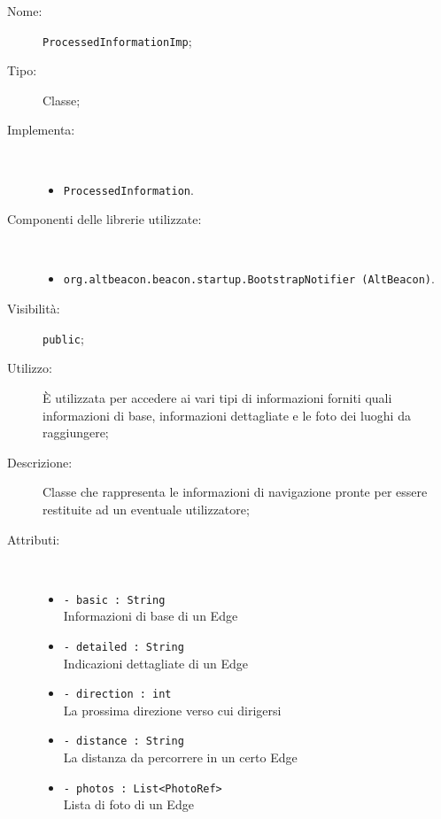 \documentclass[../DefinizioneDiProdotto.tex]{subfiles}
\begin{document}
\begin{description}
	\item[Nome:] \texttt{ProcessedInformationImp};
	\item[Tipo:] Classe;
	\item[Implementa:] \
	\begin{itemize}
		\item \texttt{ProcessedInformation}.
		
	\end{itemize}
	\item[Componenti delle librerie utilizzate:] \
	\begin{itemize}
		\item \texttt{org.altbeacon.beacon.startup.BootstrapNotifier (AltBeacon)}.
		
	\end{itemize}
	\item[Visibilità:] \texttt{public};
	\item[Utilizzo:] È utilizzata per accedere ai vari tipi di informazioni forniti quali informazioni di base, informazioni dettagliate e le foto dei luoghi da raggiungere;
	\item[Descrizione:] Classe che rappresenta le informazioni di navigazione pronte per essere restituite ad un eventuale utilizzatore;
	\item[Attributi:] \
	\begin{itemize}
		\item \texttt{- basic : String}\\
		Informazioni di base di un Edge
		
		\item \texttt{- detailed : String}\\
		Indicazioni dettagliate di un Edge
		
		\item \texttt{- direction : int}\\
		La prossima direzione verso cui dirigersi
		
		\item \texttt{- distance : String}\\
		La distanza da percorrere in un certo Edge
		
		\item \texttt{- photos : List<PhotoRef>}\\
		Lista di foto di un Edge
		

\end{itemize}
\end{description}
\end{document}
